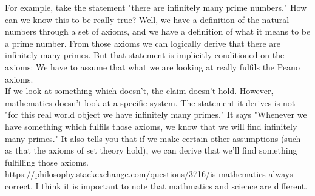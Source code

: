 \documentclass[a4paper,12pt]{article}
\begin{document}
For example, take the statement "there are infinitely many prime numbers." How can we know this to be really true? Well, we have a definition of the natural numbers through a set of axioms, and we have a definition of what it means to be a prime number. From those axioms we can logically derive that there are infinitely many primes. But that statement is implicitly conditioned on the axioms: We have to assume that what we are looking at really fulfils the Peano axioms. \\
 If we look at something which doesn't, the claim doesn't hold. However, mathematics doesn't look at a specific system. The statement it derives is not "for this real world object we have infinitely many primes." It says "Whenever we have something which fulfils those axioms, we know that we will find infinitely many primes." It also tells you that if we make certain other assumptions (such as that the axioms of set theory hold), we can derive that we'll find something fulfilling those axioms. \\
 https://philosophy.stackexchange.com/questions/3716/is-mathematics-always-correct. 
I think it is important to note that mathmatics and science are different.
 
\end{document}
